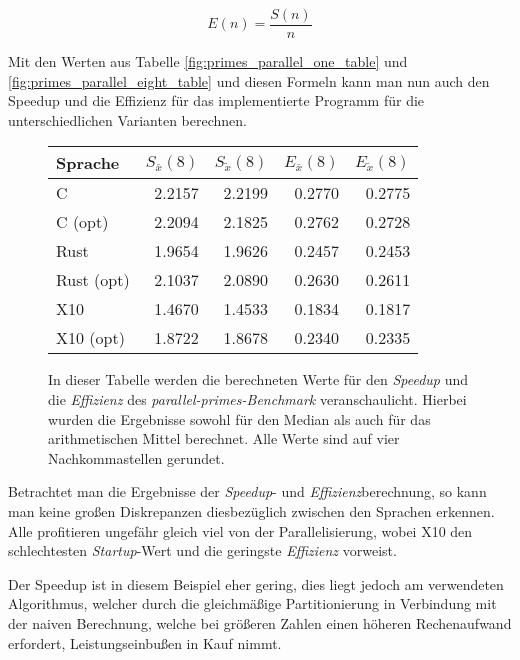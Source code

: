 \begin{equation}
	\label{formula:effizienz}
	E(n) = \frac{S(n)}{n}
\end{equation}

Mit den Werten aus Tabelle \ref{fig:primes_parallel_one_table} und \ref{fig:primes_parallel_eight_table} und diesen
Formeln kann man nun auch den Speedup und die Effizienz für das implementierte Programm für die unterschiedlichen
Varianten berechnen.

\begin{figure}[hb]
	\begin{center}
		\begin{tabular}{lrrrr}
			\toprule
			Sprache & $S_{\bar{x}}(8)$ & $S_{\tilde{x}}(8)$ & $E_{\bar{x}}(8)$ & $E_{\tilde{x}}(8)$ \\
			\midrule
			C          & 2.2157 & 2.2199 & 0.2770 & 0.2775 \\
			C (opt)    & 2.2094 & 2.1825 & 0.2762 & 0.2728 \\
			Rust       & 1.9654 & 1.9626 & 0.2457 & 0.2453 \\
			Rust (opt) & 2.1037 & 2.0890 & 0.2630 & 0.2611 \\
			X10        & 1.4670 & 1.4533 & 0.1834 & 0.1817 \\
			X10 (opt)  & 1.8722 & 1.8678 & 0.2340 & 0.2335 \\
			\bottomrule
		\end{tabular}
	\end{center}
	\caption{
		In dieser Tabelle werden die berechneten Werte für den \textit{Speedup} und die \textit{Effizienz}
		des \textit{parallel-primes-Benchmark} veranschaulicht. Hierbei wurden die Ergebnisse sowohl für den
		Median als auch für das arithmetischen Mittel berechnet. Alle Werte sind auf vier Nachkommastellen gerundet.
	}
	\label{fig:primes_parallel_speedup_efficiency_table}
\end{figure}

Betrachtet man die Ergebnisse der \textit{Speedup}- und \textit{Effizienz}berechnung,
so kann man keine großen Diskrepanzen 
diesbezüglich zwischen den Sprachen erkennen. Alle profitieren ungefähr gleich viel von der Parallelisierung,
wobei X10 den schlechtesten \textit{Startup}-Wert und die geringste \textit{Effizienz} vorweist.

Der Speedup ist in diesem Beispiel eher gering, dies liegt jedoch am verwendeten Algorithmus, welcher durch
die gleichmäßige Partitionierung in Verbindung mit der naiven Berechnung, welche bei größeren Zahlen
einen höheren Rechenaufwand erfordert, Leistungseinbußen in Kauf nimmt.

